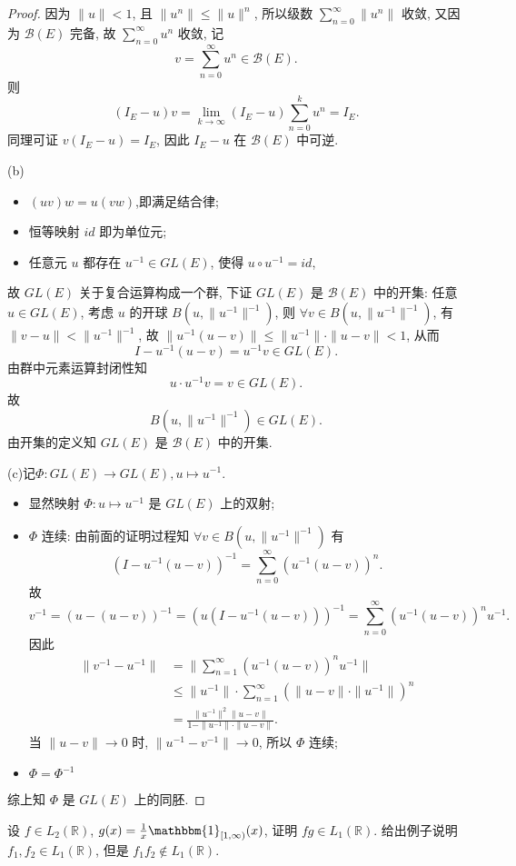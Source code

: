 \begin{proof}
因为 $\|u\|<1$, 且 $\|u^n\|\leq\|u\|^n$, 所以级数 $\sum_{n=0}^{\infty}\|u^n\|$ 收敛, 
又因为 $\mathcal{B}(E)$ 完备, 故 $\sum_{n=0}^{\infty}u^n$ 收敛, 记
\[v=\sum_{n=0}^{\infty}u^n\in\mathcal{B}(E).\]
则
\[(I_E-u)v=\lim_{k\to\infty}(I_E-u)\sum_{n=0}^ku^n=I_E.\]
同理可证 $v(I_E-u)=I_E$, 因此 $I_E-u$ 在 $\mathcal{B}(E)$ 中可逆.

(b)\begin{itemize}
\item $(uv)w=u(vw)$,即满足结合律;
\item 恒等映射 $id$ 即为单位元;
\item 任意元 $u$ 都存在 $u^{-1}\in GL(E)$, 使得 $u\circ u^{-1}=id$,
\end{itemize}
故 $GL(E)$ 关于复合运算构成一个群, 
下证 $GL(E)$ 是 $\mathcal{B}(E)$ 中的开集: 
任意 $u\in GL(E)$, 考虑 $u$ 的开球 $B(u,\|u^{-1}\|^{-1})$, 
则 $\forall v\in B(u,\|u^{-1}\|^{-1})$, 有 $\|v-u\|<\|u^{-1}\|^{-1}$, 
故 $\|u^{-1}(u-v)\|\leq \|u^{-1}\|\cdot\|u-v\|<1$, 从而
\[I-u^{-1}(u-v)=u^{-1}v\in GL(E).\]
由群中元素运算封闭性知
\[u\cdot u^{-1}v=v\in GL(E).\]
故
\[B(u,\|u^{-1}\|^{-1})\in GL(E).\]
由开集的定义知 $GL(E)$ 是 $\mathcal{B}(E)$ 中的开集.

(c)记$\Phi:GL(E)\to GL(E),u\mapsto u^{-1}$.
\begin{itemize}
\item 显然映射 $\Phi:u\mapsto u^{-1}$ 是 $GL(E)$ 上的双射;
\item $\Phi$ 连续: 由前面的证明过程知 $\forall v\in B(u,\|u^{-1}\|^{-1})$ 有
\[(I-u^{-1}(u-v))^{-1}=\sum_{n=0}^{\infty}(u^{-1}(u-v))^n.\]
故
\[v^{-1}=(u-(u-v))^{-1}=(u(I-u^{-1}(u-v)))^{-1}=\sum_{n=0}^{\infty}(u^{-1}(u-v))^nu^{-1}.\]
因此
\[\begin{split}
\|v^{-1}-u^{-1}\|
&=\|\sum_{n=1}^{\infty}(u^{-1}(u-v))^nu^{-1}\|\\
&\leq\|u^{-1}\|\cdot\sum_{n=1}^{\infty}(\|u-v\|\cdot\|u^{-1}\|)^n\\
&=\frac{\|u^{-1}\|^2\|u-v\|}{1-\|u^{-1}\|\cdot\|u-v\|}.
\end{split}\]
当 $\|u-v\|\to 0$ 时, $\|u^{-1}-v^{-1}\|\to 0$, 所以 $\Phi$ 连续;
\item $\Phi=\Phi^{-1}$
\end{itemize}
综上知 $\Phi$ 是 $GL(E)$ 上的同胚.
\end{proof}



\begin{exercise}
    设 $f\in L_2(\mathbb{R})$, $g(x)=\frac{1}{x}\mathbbm{1}_{[1,\infty)}(x)$, 
    证明 $fg\in L_1(\mathbb{R})$. 给出例子说明 $f_1,f_2\in L_1(\mathbb{R})$, 但是 $f_1f_2\notin L_1(\mathbb{R})$.
\end{exercise}

